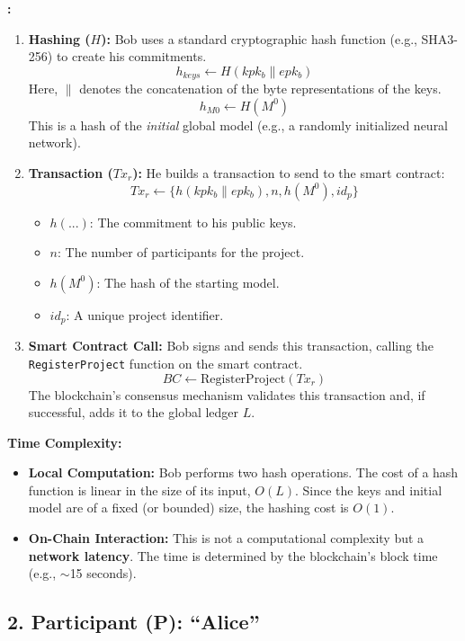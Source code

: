 \documentclass[12pt]{article}
\begin{document}
\textbf{:}
\begin{enumerate}
    \item \textbf{Hashing ($H$):} Bob uses a standard cryptographic hash function (e.g., SHA3-256) to create his commitments.
    \[
    h_{keys} \leftarrow H(kpk_b \parallel epk_b)
    \]
    Here, $\parallel$ denotes the concatenation of the byte representations of the keys.
    \[
    h_{M0} \leftarrow H(M^0)
    \]
    This is a hash of the \textit{initial} global model (e.g., a randomly initialized neural network).
    \item \textbf{Transaction ($Tx_r$):} He builds a transaction to send to the smart contract:
    \[
    Tx_r \leftarrow \{h(kpk_b \parallel epk_b), n, h(M^0), id_p\}
    \]
    \begin{itemize}
        \item $h(...)$: The commitment to his public keys.
        \item $n$: The number of participants for the project.
        \item $h(M^0)$: The hash of the starting model.
        \item $id_p$: A unique project identifier.
    \end{itemize}
    \item \textbf{Smart Contract Call:} Bob signs and sends this transaction, calling the \texttt{RegisterProject} function on the smart contract.
    \[
    BC \leftarrow \text{RegisterProject}(Tx_r)
    \]
    The blockchain's consensus mechanism validates this transaction and, if successful, adds it to the global ledger $L$.
\end{enumerate}

\textbf{Time Complexity:}
\begin{itemize}
    \item \textbf{Local Computation:} Bob performs two hash operations. The cost of a hash function is linear in the size of its input, $O(L)$. Since the keys and initial model are of a fixed (or bounded) size, the hashing cost is \textbf{$O(1)$}.
    \item \textbf{On-Chain Interaction:} This is not a computational complexity but a \textbf{network latency}. The time is determined by the blockchain's block time (e.g., $\sim$15 seconds).
\end{itemize}

\subsection*{2. Participant (P): ``Alice''}
\end{document}
